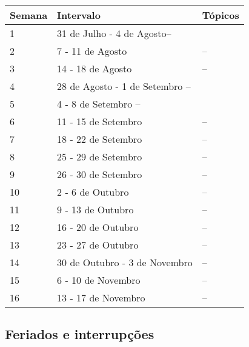 \begin{table}[H]
	\centering
	\begin{tabular}{lll}%
	\toprule
	\textbf{Semana} & \textbf{Intervalo} & \textbf{Tópicos} \\ 
	\midrule
	1	&	31 de Julho - 4 de Agosto--\\
	2	&	7 - 11 de Agosto	&	--\\%
    3 	&	14 - 18 de Agosto	&	--\\%
    4	&	28 de Agosto - 1 de Setembro --\\%
    5	&	4 - 8 de Setembro --\\%
    6	&	11 - 15 de Setembro	& 	--\\%
    7	&	18 - 22 de Setembro	&	--\\%
    8	&	25 - 29 de Setembro	&	--\\%
    9	&	26 - 30 de Setembro &	--\\%
    10	&	2 - 6 de Outubro	& 	--\\%
    11	&	9 - 13 de Outubro	&	--\\%
    12	&	16 - 20 de Outubro	& 	--\\%
    13	&	23 - 27 de Outubro 	&	--\\%
    14	&	30 de Outubro - 3 de Novembro	&	--\\%
    15	&	6 - 10 de Novembro	& 	--\\%
    16  &	13 - 17 de Novembro	&	--\\
     \bottomrule
 	 \end{tabular}
 	 \centering
\end{table}

\subsection*{Feriados e interrupções}

